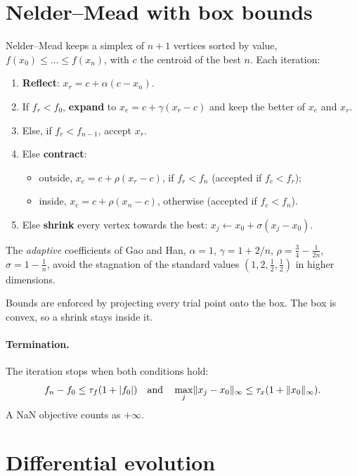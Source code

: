 \section{Nelder--Mead with box bounds}
Nelder--Mead keeps a simplex of $n+1$ vertices sorted by value,
$f(x_0)\le\dots\le f(x_n)$, with $c$ the centroid of the best $n$. Each iteration:
\begin{enumerate}
  \item \textbf{Reflect}: $x_r=c+\alpha(c-x_n)$.
  \item If $f_r<f_0$, \textbf{expand} to $x_e=c+\gamma(x_r-c)$ and keep the better of
        $x_e$ and $x_r$.
  \item Else, if $f_r<f_{n-1}$, accept $x_r$.
  \item Else \textbf{contract}:
        \begin{itemize}
          \item outside, $x_c=c+\rho(x_r-c)$, if $f_r<f_n$ (accepted if $f_c<f_r$);
          \item inside, $x_c=c+\rho(x_n-c)$, otherwise (accepted if $f_c<f_n$).
        \end{itemize}
  \item Else \textbf{shrink} every vertex towards the best:
        $x_j\leftarrow x_0+\sigma(x_j-x_0)$.
\end{enumerate}
The \emph{adaptive} coefficients of Gao and Han, $\alpha=1$, $\gamma=1+2/n$,
$\rho=\tfrac34-\tfrac1{2n}$, $\sigma=1-\tfrac1n$, avoid the stagnation of the standard
values $(1,2,\tfrac12,\tfrac12)$ in higher dimensions.

Bounds are enforced by projecting every trial point onto the box. The box is convex, so a
shrink stays inside it.

\paragraph{Termination.} The iteration stops when both conditions hold:
\[
  f_n-f_0\le\tau_f(1+|f_0|)\quad\text{and}\quad\max_j\lVert x_j-x_0\rVert_\infty\le\tau_x(1+\lVert x_0\rVert_\infty).
\]
A NaN objective counts as $+\infty$.
\begin{codepointers}
\end{codepointers}

\section{Differential evolution}
